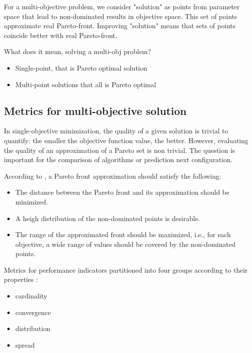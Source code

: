         For a multi-objective problem, we consider "solution" as points from parameter space that lead to non-dominated results in objective space. This set of points approximate real Pareto-front. Improving "solution" means that sets of points coincide better with real Pareto-front.

        What does it mean, solving a multi-obj problem?
        \begin{itemize}
            \item Single-point, that is Pareto optimal solution
            \item Multi-point solutions that all is Pareto optimal
        \end{itemize}

        \subsection{Metrics for multi-objective solution}

        In single-objective minimization, the quality of a given solution is trivial to quantify:
        the smaller the objective function value, the better. However, evaluating the quality of an approximation of a Pareto set is non trivial.
        The question is important for the comparison of algorithms or prediction next configuration.

        According to \cite{ZitzlerDT00}, a Pareto front approximation should satisfy the following:
        \begin{itemize}
            \item The distance between the Pareto front and its approximation should be minimized.
            \item A heigh distribution of the non-dominated points is desirable.
            \item The range of the approximated front should be maximized, i.e., for each objective, a wide range of values should be covered by the non-dominated points.
        \end{itemize}

        Metrics for performance indicators partitioned into four groups according to their properties \cite{Audet2018PerformanceII}: 
        \begin{itemize}
            \item cardinality
            \item convergence
            \item distribution
            \item spread
        \end{itemize}

